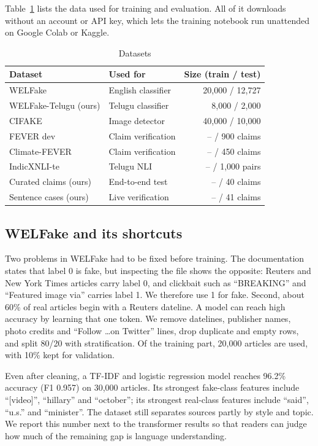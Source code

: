 \documentclass[conference]{IEEEtran}
\begin{document}
Table~\ref{tab:data} lists the data used for training and evaluation. All of it downloads without an account or API key, which lets the training notebook run unattended on Google Colab or Kaggle.

\begin{table}[t]
\caption{Datasets}
\label{tab:data}
\centering
\footnotesize
\begin{tabular}{@{}llr@{}}
\toprule
Dataset & Used for & Size (train / test) \\
\midrule
WELFake \cite{verma2021welfake} & English classifier & 20,000 / 12,727 \\
WELFake-Telugu (ours) & Telugu classifier & 8,000 / 2,000 \\
CIFAKE \cite{bird2024cifake} & Image detector & 40,000 / 10,000 \\
FEVER dev \cite{thorne2018fever} & Claim verification & -- / 900 claims \\
Climate-FEVER \cite{diggelmann2020climatefever} & Claim verification & -- / 450 claims \\
IndicXNLI-te \cite{aggarwal2022indicxnli} & Telugu NLI & -- / 1,000 pairs \\
Curated claims (ours) & End-to-end test & -- / 40 claims \\
Sentence cases (ours) & Live verification & -- / 41 claims \\
\bottomrule
\end{tabular}
\end{table}

\subsection{WELFake and its shortcuts}
Two problems in WELFake had to be fixed before training. The documentation states that label 0 is fake, but inspecting the file shows the opposite: Reuters and New York Times articles carry label 0, and clickbait such as ``BREAKING'' and ``Featured image via'' carries label 1. We therefore use 1 for fake. Second, about 60\% of real articles begin with a Reuters dateline. A model can reach high accuracy by learning that one token. We remove datelines, publisher names, photo credits and ``Follow \dots on Twitter'' lines, drop duplicate and empty rows, and split 80/20 with stratification. Of the training part, 20,000 articles are used, with 10\% kept for validation.

Even after cleaning, a TF-IDF and logistic regression model reaches 96.2\% accuracy (F1 0.957) on 30,000 articles. Its strongest fake-class features include ``[video]'', ``hillary'' and ``october''; its strongest real-class features include ``said'', ``u.s.'' and ``minister''. The dataset still separates sources partly by style and topic. We report this number next to the transformer results so that readers can judge how much of the remaining gap is language understanding.
\end{document}
